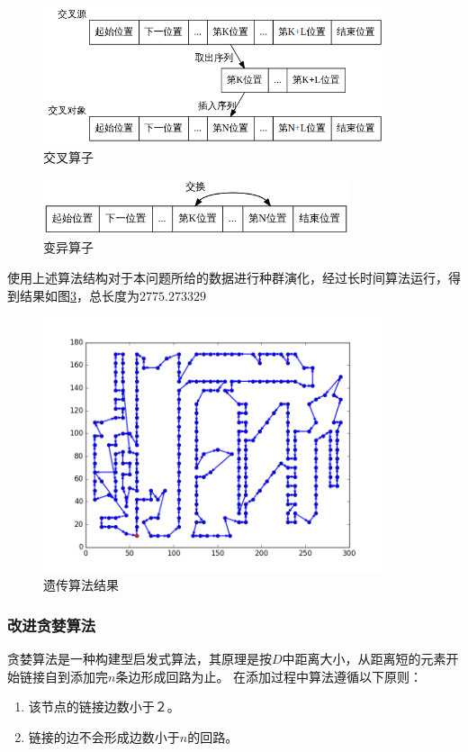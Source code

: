 \documentclass[fontset=windows,a4paper,12pt]{ctexart}
\begin{document}
		\begin{figure}[htbp]
			\centering
			\includegraphics[width=10cm]{pic/life_cross.png}
			\caption{交叉算子}
			\label{fig:cross}
		\end{figure}
		\begin{figure}[htbp]
			\centering
			\includegraphics[width=9cm]{pic/life_muate.png}
			\caption{变异算子}
			\label{fig:muate}
		\end{figure}
        使用上述算法结构对于本问题所给的数据进行种群演化，经过长时间算法运行，得到结果如图\ref{fig:ga}，总长度为$2775.273329$
        \begin{figure}[htbp]
        	\centering
        	\includegraphics[width=10cm]{pic/ga_result.png}
        	\caption{遗传算法结果}
        	\label{fig:ga}
        \end{figure}
      \subsubsection{改进贪婪算法\cite{饶卫振2012基于求解}}
        贪婪算法是一种构建型启发式算法，其原理是按$D$中距离大小，从距离短的元素开始链接自到添加完$n$条边形成回路为止。
        在添加过程中算法遵循以下原则：
        \begin{enumerate}
        	\item 该节点的链接边数小于２。
        	\item 链接的边不会形成边数小于$n$的回路。
        \end{enumerate}
        
\end{document}
